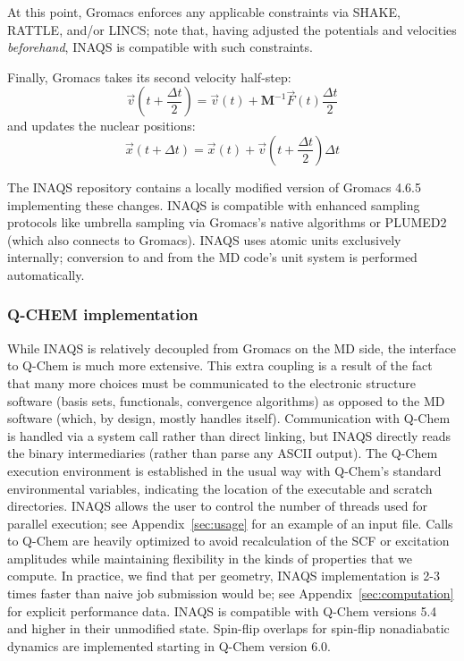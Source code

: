\documentclass[journal=jctcce,manuscript=article,layout=traditional]{achemso}
\newcommand{\mat}[1]{\ensuremath{\mathbf{#1}}}
\begin{document}
At this point, Gromacs enforces any applicable constraints via SHAKE, RATTLE, and/or LINCS; note that, having adjusted the potentials and velocities {\em beforehand}, INAQS  is compatible with such constraints. 

Finally, Gromacs takes its second velocity half-step:
\begin{equation}\label{eq:vvhalfstep2}
    \vec{v}(t+\frac{\Delta t}{2}) = \vec{v}(t) + \mat{M}^{-1}\vec{F}(t)\frac{\Delta t}{2}
\end{equation}
and updates the nuclear positions:
\begin{equation}
    \vec{x}(t+ \Delta t) = \vec{x}(t) + \vec{v}(t+\frac{\Delta t}{2}) \Delta t
\end{equation}
%

The INAQS repository contains a locally modified version of Gromacs 4.6.5 implementing these changes.
INAQS is compatible with
%
%
enhanced sampling protocols like umbrella sampling via Gromacs's native algorithms or PLUMED2\cite{plumed2} (which also connects to Gromacs).
INAQS uses atomic units exclusively internally; conversion to and from the MD code's unit system is performed automatically.



\subsubsection{Q-CHEM implementation}
While INAQS is relatively decoupled from Gromacs on the MD side, the interface to Q-Chem is much more extensive.
This extra coupling is a result of the fact that many more choices must be communicated to the electronic structure  software (basis sets, functionals, convergence algorithms) as opposed to the MD software (which, by design, mostly handles itself).
Communication with Q-Chem is handled via a system call rather than direct linking, but INAQS directly reads the binary intermediaries (rather than parse any ASCII output).
The Q-Chem execution environment is established in the usual way with Q-Chem's standard environmental variables, indicating the location of the executable and scratch directories.
INAQS allows the user to control the number of threads used for parallel execution; see Appendix~\ref{sec:usage} for an example of an input file.
Calls to Q-Chem are heavily optimized to avoid recalculation of the SCF or excitation amplitudes while maintaining flexibility in the kinds of properties that we compute.
In practice, we find that per geometry, INAQS implementation is 2-3 times faster than naive job submission would be; see Appendix~\ref{sec:computation} for explicit performance data.
INAQS is compatible with Q-Chem versions 5.4 and higher in their unmodified state.
Spin-flip overlaps for spin-flip nonadiabatic dynamics 
%
are implemented starting in Q-Chem version 6.0.
\end{document}
